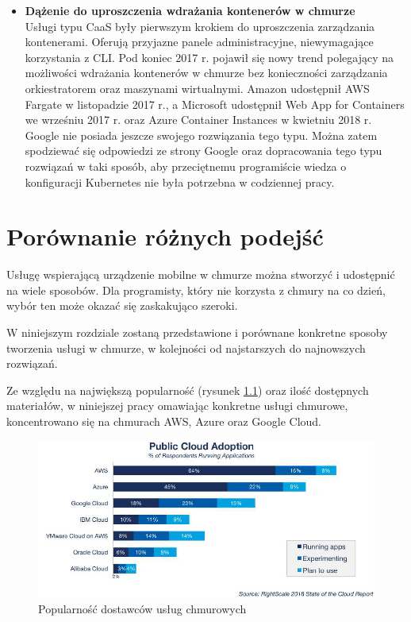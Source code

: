 \documentclass[12pt,a4paper,twoside,titlepage,openright]{book}
\begin{document}
\begin{itemize}
\item \textbf{Dążenie do uproszczenia wdrażania kontenerów w chmurze} \\
Usługi typu CaaS były pierwszym krokiem do uproszczenia zarządzania kontenerami. Oferują przyjazne panele administracyjne, niewymagające korzystania z CLI. Pod koniec 2017 r. pojawił się nowy trend polegający na możliwości wdrażania kontenerów w chmurze bez konieczności zarządzania orkiestratorem oraz maszynami wirtualnymi. Amazon udostępnił AWS Fargate w listopadzie 2017 r.,\cite{siteAwsFargateIntroducing} a Microsoft udostępnił Web App for Containers we wrześniu 2017 r.\cite{siteAzureWebAppContainersAvailable} oraz Azure Container Instances w kwietniu 2018 r.\cite{siteAzureContainerInstancesIntroducing} Google nie posiada jeszcze swojego rozwiązania tego typu. Można zatem spodziewać się odpowiedzi ze strony Google oraz dopracowania tego typu rozwiązań w taki sposób, aby przeciętnemu programiście wiedza o konfiguracji Kubernetes nie była potrzebna w codziennej pracy.

\end{itemize}

\chapter{Porównanie różnych podejść}

Usługę wspierającą urządzenie mobilne w chmurze można stworzyć i udostępnić na wiele sposobów. Dla programisty, który nie korzysta z chmury na co dzień, wybór ten może okazać się zaskakująco szeroki.

W niniejszym rozdziale zostaną przedstawione i porównane konkretne sposoby tworzenia usługi w chmurze, w kolejności od najstarszych do najnowszych rozwiązań.

Ze względu na największą popularność (rysunek \ref{fig:popularnosc}) oraz ilość dostępnych materiałów, w niniejszej pracy omawiając konkretne usługi chmurowe, koncentrowano się na chmurach AWS, Azure oraz Google Cloud.

\begin{figure}[h]
	\centering
			\includegraphics[width=\textwidth]{popularnosc.png}
		\caption{Popularność dostawców usług chmurowych \cite{rightscaleReport}}
		\label{fig:popularnosc}
\end{figure}
\end{document}
